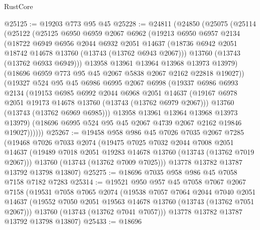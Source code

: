 \begin{lexlean}{RustCore}
\begin{coremodule}
@25125 := @19203 @773 @95 @45
@25228 := @24811
    (@24850
      (@25075
        (@25114
          (@25122
            (@25125
              @6950
              @6959
              @2067
              @6962
              (@19213
                @6950
                @6957
                @2134
                (@18722
                  @6949
                  @6956
                  @2044
                  @6932
                  @2051
                  @14637
                  (@18736 @6942 @2051 @18742 @14678 @13760 (@13743 (@13762 @6943 @2067)))
                  @13760
                  (@13743 (@13762 @6933 @6949)))
                @13958
                @13961
                @13964
                @13968
                @13973
                @13979)
              (@18696 @6959 @773 @95 @45 @2067 @5838 @2067 @2162 @22818 @19027))
            (@19327
              @524
              @95
              @45
              @6986
              @6995
              @2067
              @6998
              (@19337
                @6986
                @6993
                @2134
                (@19153
                  @6985
                  @6992
                  @2044
                  @6968
                  @2051
                  @14637
                  (@19167 @6978 @2051 @19173 @14678 @13760 (@13743 (@13762 @6979 @2067)))
                  @13760
                  (@13743 (@13762 @6969 @6985)))
                @13958
                @13961
                @13964
                @13968
                @13973
                @13979)
              (@18696 @6995 @524 @95 @45 @2067 @4739 @2067 @2162 @19846 @19027))))))
@25267 := @19458
    @958
    @986
    @45
    @7026
    @7035
    @2067
    @7285
    (@19468
      @7026
      @7033
      @2074
      (@19475
        @7025
        @7032
        @2044
        @7008
        @2051
        @14637
        (@19489 @7018 @2051 @19283 @14678 @13760 (@13743 (@13762 @7019 @2067)))
        @13760
        (@13743 (@13762 @7009 @7025)))
      @13778
      @13782
      @13787
      @13792
      @13798
      @13807)
@25275 := @18696 @7035 @958 @986 @45 @7058 @7158 @7182 @7283
@25314 := @19521
    @950
    @957
    @45
    @7058
    @7067
    @2067
    @7158
    (@19531
      @7058
      @7065
      @2074
      (@19538
        @7057
        @7064
        @2044
        @7040
        @2051
        @14637
        (@19552 @7050 @2051 @19563 @14678 @13760 (@13743 (@13762 @7051 @2067)))
        @13760
        (@13743 (@13762 @7041 @7057)))
      @13778
      @13782
      @13787
      @13792
      @13798
      @13807)
@25433 := @18696

\end{coremodule}
\end{lexlean}
